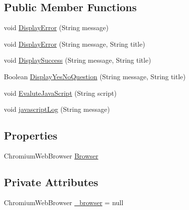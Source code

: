 \subsection*{Public Member Functions}
\begin{DoxyCompactItemize}
\item 
void \hyperlink{class_web_analyzer_1_1_u_i_1_1_interaction_objects_1_1_base_interaction_object_ab7fc25e42888acfba791389cbba16069}{Display\+Error} (String message)
\item 
void \hyperlink{class_web_analyzer_1_1_u_i_1_1_interaction_objects_1_1_base_interaction_object_ae5aa6b0b986b2e3a47bf27a67eb79ca1}{Display\+Error} (String message, String title)
\item 
void \hyperlink{class_web_analyzer_1_1_u_i_1_1_interaction_objects_1_1_base_interaction_object_a362619127fbab55c978fe11d1778f4ae}{Display\+Success} (String message, String title)
\item 
Boolean \hyperlink{class_web_analyzer_1_1_u_i_1_1_interaction_objects_1_1_base_interaction_object_afea2b7dc8ced6dababfd23381af7485d}{Display\+Yes\+No\+Question} (String message, String title)
\item 
void \hyperlink{class_web_analyzer_1_1_u_i_1_1_interaction_objects_1_1_base_interaction_object_af86a8726164ce830fa14f49160bb3f05}{Evalute\+Java\+Script} (String script)
\item 
void \hyperlink{class_web_analyzer_1_1_u_i_1_1_interaction_objects_1_1_base_interaction_object_acec4cefdd4842652a61bc0cb62746a0d}{javascript\+Log} (String message)
\end{DoxyCompactItemize}
\subsection*{Properties}
\begin{DoxyCompactItemize}
\item 
Chromium\+Web\+Browser \hyperlink{class_web_analyzer_1_1_u_i_1_1_interaction_objects_1_1_base_interaction_object_aac4f2f8441547dc677f700485c295259}{Browser}
\end{DoxyCompactItemize}
\subsection*{Private Attributes}
\begin{DoxyCompactItemize}
\item 
Chromium\+Web\+Browser \hyperlink{class_web_analyzer_1_1_u_i_1_1_interaction_objects_1_1_base_interaction_object_aa56933a7ca14c6251019e27c6ec97813}{\+\_\+browser} = null
\end{DoxyCompactItemize}


